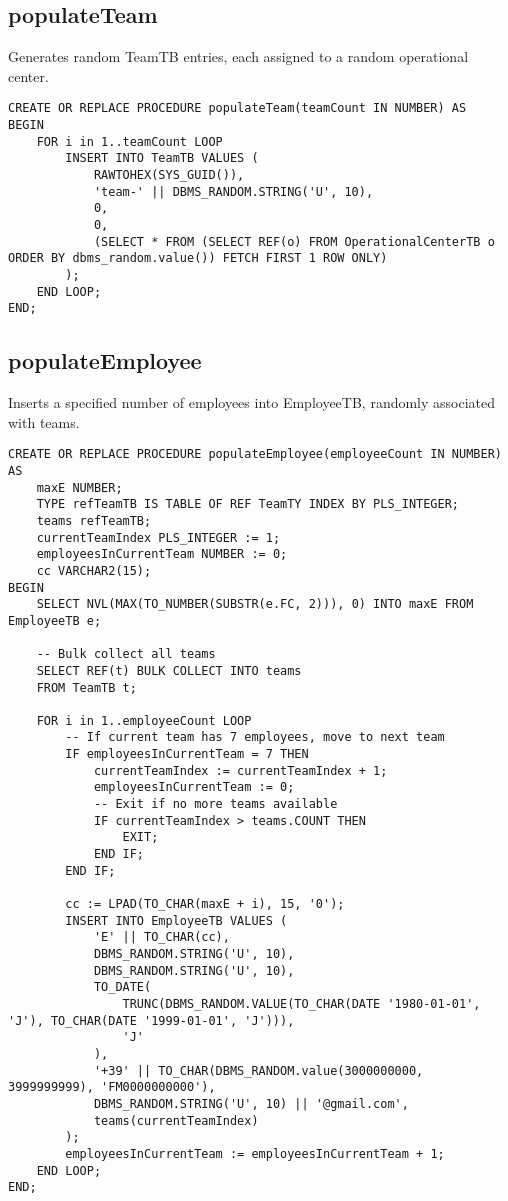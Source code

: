 \subsection*{populateTeam}
Generates random TeamTB entries, each assigned to a random operational center.
\begin{lstlisting}
CREATE OR REPLACE PROCEDURE populateTeam(teamCount IN NUMBER) AS
BEGIN
    FOR i in 1..teamCount LOOP
        INSERT INTO TeamTB VALUES (
            RAWTOHEX(SYS_GUID()),
            'team-' || DBMS_RANDOM.STRING('U', 10),
            0,
            0,
            (SELECT * FROM (SELECT REF(o) FROM OperationalCenterTB o ORDER BY dbms_random.value()) FETCH FIRST 1 ROW ONLY)
        );
    END LOOP;
END;
\end{lstlisting}

\subsection*{populateEmployee}
Inserts a specified number of employees into EmployeeTB, randomly associated with teams.
\begin{lstlisting}
CREATE OR REPLACE PROCEDURE populateEmployee(employeeCount IN NUMBER) AS
    maxE NUMBER;
    TYPE refTeamTB IS TABLE OF REF TeamTY INDEX BY PLS_INTEGER;
    teams refTeamTB;
    currentTeamIndex PLS_INTEGER := 1;
    employeesInCurrentTeam NUMBER := 0;
    cc VARCHAR2(15);
BEGIN
    SELECT NVL(MAX(TO_NUMBER(SUBSTR(e.FC, 2))), 0) INTO maxE FROM EmployeeTB e;
    
    -- Bulk collect all teams
    SELECT REF(t) BULK COLLECT INTO teams
    FROM TeamTB t;

    FOR i in 1..employeeCount LOOP
        -- If current team has 7 employees, move to next team
        IF employeesInCurrentTeam = 7 THEN
            currentTeamIndex := currentTeamIndex + 1;
            employeesInCurrentTeam := 0;
            -- Exit if no more teams available
            IF currentTeamIndex > teams.COUNT THEN
                EXIT;
            END IF;
        END IF;

        cc := LPAD(TO_CHAR(maxE + i), 15, '0');
        INSERT INTO EmployeeTB VALUES (
            'E' || TO_CHAR(cc),
            DBMS_RANDOM.STRING('U', 10),
            DBMS_RANDOM.STRING('U', 10),
            TO_DATE(
                TRUNC(DBMS_RANDOM.VALUE(TO_CHAR(DATE '1980-01-01', 'J'), TO_CHAR(DATE '1999-01-01', 'J'))),
                'J'
            ),
            '+39' || TO_CHAR(DBMS_RANDOM.value(3000000000, 3999999999), 'FM0000000000'),
            DBMS_RANDOM.STRING('U', 10) || '@gmail.com',
            teams(currentTeamIndex)
        );
        employeesInCurrentTeam := employeesInCurrentTeam + 1;
    END LOOP;
END;
\end{lstlisting}

